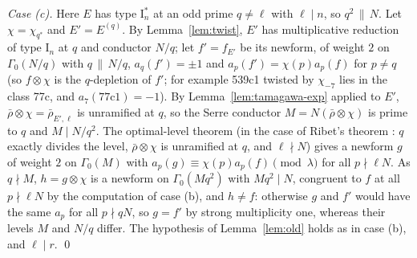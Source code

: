 \documentclass[11pt]{amsart}
\theoremstyle{definition}
\begin{document}
\medskip\noindent\emph{Case (c).} Here $E$ has type $\mathrm{I}_n^*$ at an odd prime $q\ne\ell$ with $\ell\mid n$, so $q^2\,\|\,N$. Let $\chi=\chi_{q^*}$ and $E'=E^{(q)}$. By Lemma~\ref{lem:twist}, $E'$ has multiplicative reduction of type $\mathrm{I}_n$ at $q$ and conductor $N/q$; let $f'=f_{E'}$ be its newform, of weight $2$ on $\Gamma_0(N/q)$ with $q\,\|\,N/q$, $a_q(f')=\pm1$ and $a_p(f')=\chi(p)a_p(f)$ for $p\ne q$ (so $f\otimes\chi$ is the $q$-depletion of $f'$; for example 539c1 twisted by $\chi_{-7}$ lies in the class 77c, and $a_7(\text{77c1})=-1$). By Lemma~\ref{lem:tamagawa-exp} applied to $E'$, $\bar\rho\otimes\chi=\bar\rho_{E',\ell}$ is unramified at $q$, so the Serre conductor $M=N(\bar\rho\otimes\chi)$ is prime to $q$ and $M\mid N/q^2$. The optimal-level theorem (in the case of Ribet's theorem \cite[Theorem 1.1]{Ribet90}: $q$ exactly divides the level, $\bar\rho\otimes\chi$ is unramified at $q$, and $\ell\nmid N$) gives a newform $g$ of weight $2$ on $\Gamma_0(M)$ with $a_p(g)\equiv\chi(p)a_p(f)\pmod\lambda$ for all $p\nmid\ell N$. As $q\nmid M$, $h=g\otimes\chi$ is a newform on $\Gamma_0(Mq^2)$ with $Mq^2\mid N$, congruent to $f$ at all $p\nmid\ell N$ by the computation of case (b), and $h\ne f$: otherwise $g$ and $f'$ would have the same $a_p$ for all $p\nmid qN$, so $g=f'$ by strong multiplicity one, whereas their levels $M$ and $N/q$ differ. The hypothesis of Lemma~\ref{lem:old} holds as in case (b), and $\ell\mid r$. \qed
\end{document}
